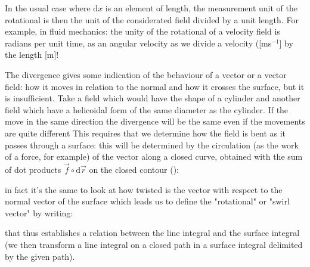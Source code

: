 	In the usual case where $\mathrm{d}x$ is an element of length, the measurement unit of the rotational is then the unit of the considerated field divided by a unit length. For example, in fluid mechanics: the unity of the rotational of a velocity field is radians per unit time, as an angular velocity as we divide a velocity ([ms$^{-1}$] by the length [m]!
	
	The divergence gives some indication of the behaviour of a vector or a vector field: how it moves in relation to the normal and how it crosses the surface, but it is insufficient. Take a field which would have the shape of a cylinder and another field which have a helicoidal form of the same diameter as the cylinder. If the move  in the same direction the divergence will be the same even if the movements are quite different This requires that we determine how the field is bent as it passes through a surface: this will be determined by the circulation (as the work of a force, for example) of the vector along a closed curve, obtained with the sum of dot products $\vec{f}\circ \mathrm{d}\vec{r}$ on the closed contour ():
	
	in fact it's the same to look at how twisted is the vector with respect to the normal vector of the surface which leads us to define the "rotational" or "swirl vector" by writing:
	
	that thus establishes a relation between the line integral and the surface integral (we then transform a line integral on a closed path in a surface integral delimited by the given path).
	

